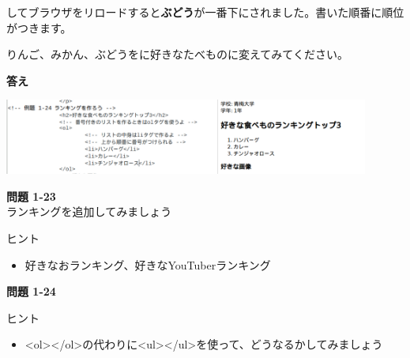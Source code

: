 \bigskip


してブラウザをリロードすると\textbf{ぶどう}が一番下にされました。書いた順番に順位がつきます。

りんご、みかん、ぶどうをに好きなたべものに変えてみてください。


\bigskip
\clearpage
\textbf{答え}


\bigskip



\includegraphics[width=0.9\textwidth]{text01-img/textbook-img184.png}


\bigskip


\bigskip


\bigskip

\noindent \textbf{問題 1-23}\\
ランキングを追加してみましょう

ヒント

\begin{itemize}
  \item
        好きなおランキング、好きなYouTuberランキング
\end{itemize}


\bigskip

\bigskip

\noindent \textbf{問題 1-24}

ヒント

\begin{itemize}
  \item
        {\textless}ol{\textgreater}{\textless}/ol{\textgreater}の代わりに{\textless}ul{\textgreater}{\textless}/ul{\textgreater}を使って、どうなるかしてみましょう
\end{itemize}



\bigskip

\clearpage




